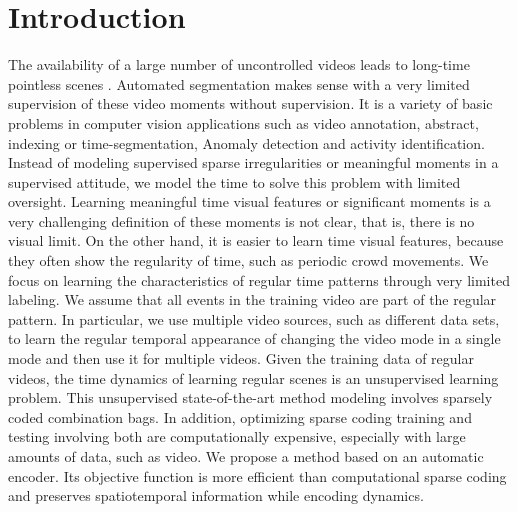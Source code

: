 \documentclass[10pt,twocolumn,letterpaper]{article}
\begin{document}
\section{Introduction}
The availability of a large number of uncontrolled videos leads to long-time pointless scenes \cite{Sun_2014_Ranking}. Automated segmentation makes sense with a very limited supervision of these video moments without supervision. It is a variety of basic problems in computer vision applications such as video annotation\cite{Vondrick_2013_Efficiently}, abstract, indexing or time-segmentation\cite{Laptev_2008_Learning}, Anomaly detection and activity identification\cite{Karpathy_2014_Large-scale}. Instead of modeling supervised sparse irregularities or meaningful moments in a supervised attitude, we model the time to solve this problem with limited oversight. Learning meaningful time visual features or significant moments is a very challenging definition of these moments is not clear, that is, there is no visual limit. On the other hand, it is easier to learn time visual features, because they often show the regularity of time, such as periodic crowd movements. We focus on learning the characteristics of regular time patterns through very limited labeling. We assume that all events in the training video are part of the regular pattern. In particular, we use multiple video sources, such as different data sets, to learn the regular temporal appearance of changing the video mode in a single mode and then use it for multiple videos. Given the training data of regular videos, the time dynamics of learning regular scenes is an unsupervised learning problem. This unsupervised state-of-the-art method modeling involves sparsely coded combination bags\cite{Lu_2013_Abnormal}\cite{Zhao_2011_Online}\cite{Cong_2011_Sparse}. In addition, optimizing sparse coding training and testing involving both are computationally expensive, especially with large amounts of data, such as video. We propose a method based on an automatic encoder. Its objective function is more efficient than computational sparse coding and preserves spatiotemporal information while encoding dynamics.
\end{document}
